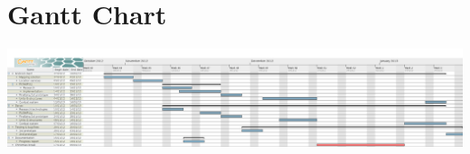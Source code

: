 \documentclass[11pt,fleqn,twoside]{article}
\begin{document}
\glsaddall
\printglossaries

\nocite{*}


\renewcommand{\refname}{Annotated Bibliography}  %

\newpage
\thispagestyle{empty}
\appendix
\section{Gantt Chart}
\center
\includegraphics[angle=-90,totalheight=\textheight]{weekly-plan.png}
% 
\end{document}
